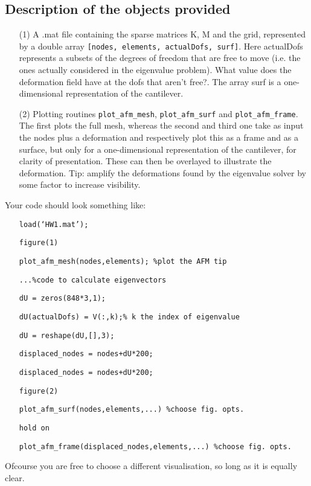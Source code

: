 \documentclass[12pt]{article}
\begin{document}
\subsection{Description of the objects provided}
\begin{itemize}
\item[(1)] A .mat file containing the sparse matrices K, M and the grid, represented by a double array
\texttt{[nodes, elements, actualDofs, surf]}. Here actualDofs represents a subsets of the degrees of freedom that are free to move (i.e. the ones actually considered in the eigenvalue problem). What value does the deformation field have at the dofs that aren’t free?. The array surf is a one-dimensional representation of the cantilever.
\item[(2)] Plotting routines \texttt{plot\_afm\_mesh}, \texttt{plot\_afm\_surf} and \texttt{plot\_afm\_frame}. The first plots the full
mesh, whereas the second and third one take as input the nodes plus a deformation and respectively plot this as a frame and as a surface, but only for a one-dimensional representation of the
cantilever, for clarity of presentation. These can then be overlayed to illustrate the deformation. Tip: amplify the deformations found by the eigenvalue solver by some factor to increase visibility.
\end{itemize}
Your code should look something like:
\begin{itemize}
\item[]\texttt{load(`HW1.mat');}
\item[]\texttt{figure(1)}
\item[]\texttt{plot\_afm\_mesh(nodes,elements);  \%plot the AFM tip}
\item[]\texttt{...\%code to calculate eigenvectors}
\item[]\texttt{dU = zeros(848*3,1);}
\item[]\texttt{dU(actualDofs) = V(:,k);\% k the index of eigenvalue}
\item[]\texttt{dU = reshape(dU,[],3);}
\item[]\texttt{displaced\_nodes = nodes+dU*200;}
\item[]\texttt{displaced\_nodes = nodes+dU*200;}
\item[]\texttt{figure(2)}
\item[]\texttt{plot\_afm\_surf(nodes,elements,...) \%choose fig. opts.}
\item[]\texttt{hold on}
\item[]\texttt{plot\_afm\_frame(displaced\_nodes,elements,...) \%choose fig. opts.}
\end{itemize}
Ofcourse you are free to choose a different visualisation, so long as it is equally clear.
\end{document}

